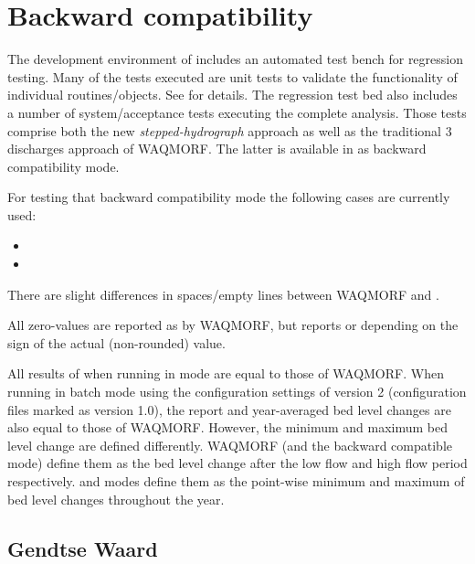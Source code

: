 \chapter{Backward compatibility} \label{Chp:Backward}

The development environment of \dfastmi includes an automated test bench for regression testing.
Many of the tests executed are unit tests to validate the functionality of individual routines/objects.
See \citet{trm} for details.
The regression test bed also includes a number of system/acceptance tests executing the complete \dfmi analysis.
Those tests comprise both the new \emph{stepped-hydrograph} approach as well as the traditional 3 discharges approach of WAQMORF.
The latter is available in  as backward compatibility mode.

For testing that backward compatibility mode the following cases are currently used:

\begin{itemize}
\item {}
\item {}
\end{itemize}

\begin{Remark}
\item There are slight differences in spaces/empty lines between WAQMORF and \dfmi.
\item All zero-values are reported as  by WAQMORF, but \dfmi reports  or  depending on the sign of the actual (non-rounded) value.
\item All results of \dfmi when running in  mode are equal to those of WAQMORF.
When \dfmi running in batch mode using the configuration settings of \dfmi version 2 (configuration files marked as version 1.0), the report and year-averaged bed level changes are also equal to those of WAQMORF.
However, the minimum and maximum bed level change are defined differently.
WAQMORF (and the backward compatible \dfmi{}  mode) define them as the bed level change after the low flow and high flow period respectively.
\dfmi{}  and  modes define them as the point-wise minimum and maximum of bed level changes throughout the year.
\end{Remark}

\section{Gendtse Waard}\label{Sec:GendtseWaard_backward}

